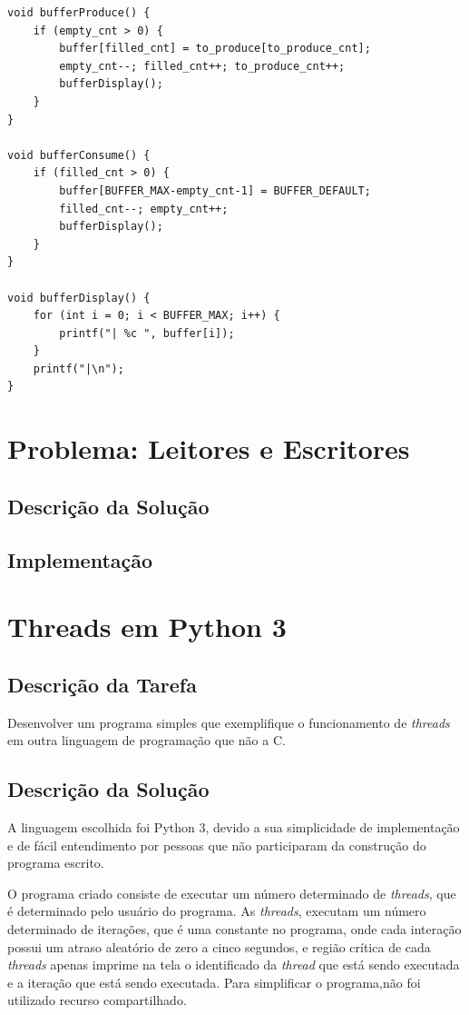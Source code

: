 \documentclass[a4paper, 11pt]{article}
\begin{document}
\begin{lstlisting}
void bufferProduce() {
    if (empty_cnt > 0) {
        buffer[filled_cnt] = to_produce[to_produce_cnt];
        empty_cnt--; filled_cnt++; to_produce_cnt++;
        bufferDisplay();
    }
}

void bufferConsume() {
    if (filled_cnt > 0) {
        buffer[BUFFER_MAX-empty_cnt-1] = BUFFER_DEFAULT;
        filled_cnt--; empty_cnt++;
        bufferDisplay();
    }
}

void bufferDisplay() {
    for (int i = 0; i < BUFFER_MAX; i++) {
        printf("| %c ", buffer[i]);
    }
    printf("|\n");
}
\end{lstlisting}

\section{Problema: Leitores e Escritores}
\subsection{Descrição da Solução}
\subsection{Implementação}

\section{Threads em Python 3}
\subsection{Descrição da Tarefa}
Desenvolver um programa simples que exemplifique o funcionamento de \textit{threads} em outra linguagem de programação que não a C.

\subsection{Descrição da Solução}
A linguagem escolhida foi Python 3, devido a sua simplicidade de implementação e de fácil entendimento por pessoas que não participaram da construção do programa escrito.

O programa criado consiste de executar um número determinado de \textit{threads}, que é determinado pelo usuário do programa. As \textit{threads}, executam um número determinado de iterações, que é uma constante no programa, onde cada interação possui um atraso aleatório de zero a cinco segundos, e região crítica de cada \textit{threads} apenas imprime na tela o identificado da \textit{thread} que está sendo executada e a iteração que está sendo executada. Para simplificar o programa,não foi utilizado recurso compartilhado.
\end{document}
